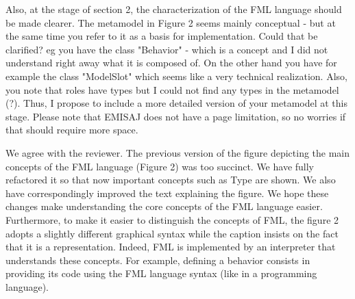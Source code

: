 \documentclass[10pt]{article}
\begin{document}
\begin{response}
%
%
%
%
%
%
%
%
%

\end{response}

\begin{response}{Also, at the stage of section 2, the characterization of the FML language should be made clearer. The metamodel in Figure 2 seems mainly conceptual - but at the same time you refer to it as a basis for implementation. Could that be clarified? eg you have the class "Behavior" - which is a concept and I did not understand right away what it is composed of. On the other hand you have for example the class "ModelSlot" which seems like a very technical realization. Also, you note that roles have types but I could not find any types in the metamodel (?). Thus, I propose to include a more detailed version of your metamodel at this stage. Please note that EMISAJ does not have a page limitation, so no worries if that should require more space.}

We agree with the reviewer. The previous version of the figure depicting the main concepts of the FML language (Figure 2) was too succinct. We have fully refactored it so that now important concepts such as \textsf{Type} are shown. We also have correspondingly improved the text explaining the figure. We hope these changes make understanding the core concepts of the FML language easier.
Furthermore, to make it easier to distinguish the concepts of FML, the figure 2 adopts a slightly different graphical syntax while the caption insists on the fact that it is a representation. Indeed, FML is implemented by an interpreter that understands these concepts. For example, defining a behavior consists in providing its code using the FML language syntax (like in a programming language).

\end{response}
\end{document}
